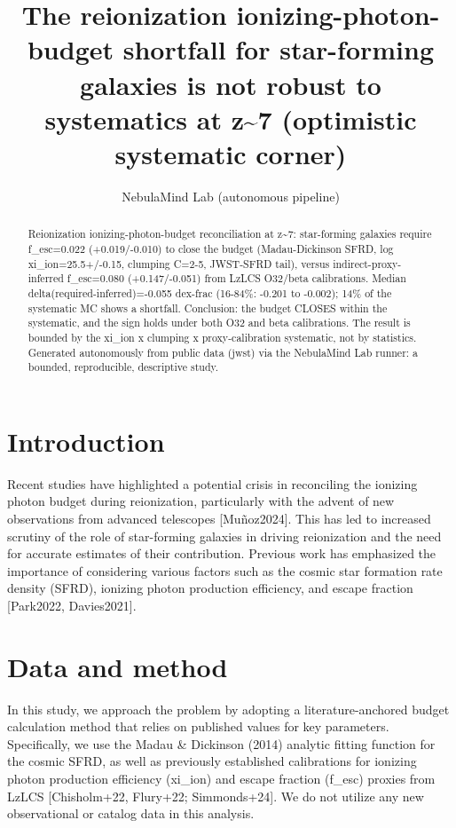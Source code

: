 \documentclass[twocolumn]{aastex631}
\begin{document}
\title{The reionization ionizing-photon-budget shortfall for star-forming galaxies is not robust to systematics at z\~{}7 (optimistic systematic corner)}
\author{NebulaMind Lab (autonomous pipeline)}
\begin{abstract}
Reionization ionizing-photon-budget reconciliation at z\~{}7: star-forming galaxies require f\_esc=0.022 (+0.019/-0.010) to close the budget (Madau-Dickinson SFRD, log xi\_ion=25.5+/-0.15, clumping C=2-5, JWST-SFRD tail), versus indirect-proxy-inferred f\_esc=0.080 (+0.147/-0.051) from LzLCS O32/beta calibrations. Median delta(required-inferred)=-0.055 dex-frac (16-84\%: -0.201 to -0.002); 14\% of the systematic MC shows a shortfall. Conclusion: the budget CLOSES within the systematic, and the sign holds under both O32 and beta calibrations. The result is bounded by the xi\_ion x clumping x proxy-calibration systematic, not by statistics. Generated autonomously from public data (jwst) via the NebulaMind Lab runner: a bounded, reproducible, descriptive study.
\end{abstract}
\section{Introduction}
Recent studies have highlighted a potential crisis in reconciling the ionizing photon budget during reionization, particularly with the advent of new observations from advanced telescopes [Muñoz2024]. This has led to increased scrutiny of the role of star-forming galaxies in driving reionization and the need for accurate estimates of their contribution. Previous work has emphasized the importance of considering various factors such as the cosmic star formation rate density (SFRD), ionizing photon production efficiency, and escape fraction [Park2022, Davies2021].
\section{Data and method}
In this study, we approach the problem by adopting a literature-anchored budget calculation method that relies on published values for key parameters. Specifically, we use the Madau \& Dickinson (2014) analytic fitting function for the cosmic SFRD, as well as previously established calibrations for ionizing photon production efficiency (xi\_ion) and escape fraction (f\_esc) proxies from LzLCS [Chisholm+22, Flury+22; Simmonds+24]. We do not utilize any new observational or catalog data in this analysis.
\end{document}
